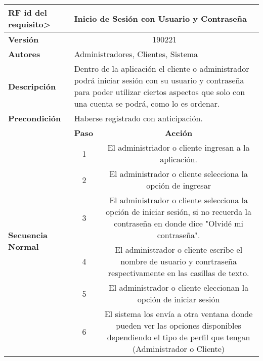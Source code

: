 \documentclass[conference]{IEEEtran}
\begin{document}
\begin{table}[H]
  \centering
   \begin{adjustbox}{width=0.45\textwidth}
    \begin{tabular}{|p{11.215em}|p{5.355em}|c|}
    \toprule
    \textbf{RF id del requisito>} & \multicolumn{2}{p{37.355em}|}{\textbf{Inicio de Sesión con Usuario y Contraseña}} \\
    \midrule
    \textbf{Versión} & \multicolumn{2}{c|}{190221} \\
    \midrule
    \textbf{Autores} & \multicolumn{2}{p{37.355em}|}{Administradores, Clientes, Sistema} \\
    \midrule
    \textbf{Descripción} & \multicolumn{2}{p{37.355em}|}{Dentro de la aplicación el cliente o administrador podrá iniciar sesión con su usuario y contraseña para poder utilizar ciertos aspectos que solo con una cuenta se podrá, como lo es ordenar.} \\
    \midrule
    \textbf{Precondición} & \multicolumn{2}{p{37.355em}|}{Haberse registrado con anticipación.} \\
    \midrule
    \multirow{9}[16]{*}{\textbf{Secuencia Normal}} & \textbf{Paso} & \multicolumn{1}{p{32em}|}{\textbf{Acción}} \\
\cmidrule{2-3}    \multicolumn{1}{|c|}{} & \multicolumn{1}{c|}{\multirow{2}[2]{*}{1}} & \multicolumn{1}{c|}{\multirow{2}[2]{*}{El administriador o cliente ingresan a la aplicación.}} \\
    \multicolumn{1}{|c|}{} & \multicolumn{1}{c|}{} &  \\
\cmidrule{2-3}    \multicolumn{1}{|c|}{} & \multicolumn{1}{c|}{2} & \multicolumn{1}{p{32em}|}{El administrador o cliente selecciona la opción de ingresar} \\
\cmidrule{2-3}    \multicolumn{1}{|c|}{} & \multicolumn{1}{c|}{3} & \multicolumn{1}{p{32em}|}{El administrador o cliente selecciona la opción de iniciar sesión, si no recuerda la contraseña en donde dice "Olvidé mi contraseña".} \\
\cmidrule{2-3}    \multicolumn{1}{|c|}{} & \multicolumn{1}{c|}{4} & \multicolumn{1}{p{32em}|}{El administrador o cliente escribe el nombre de usuario y conrtraseña respectivamente en las casillas de texto.} \\
\cmidrule{2-3}    \multicolumn{1}{|c|}{} & \multicolumn{1}{c|}{5} & \multicolumn{1}{p{32em}|}{El administrador o cliente eleccionan la opción de iniciar sesión} \\
\cmidrule{2-3}    \multicolumn{1}{|c|}{} & \multicolumn{1}{c|}{6} & \multicolumn{1}{p{32em}|}{El sistema los envía a otra ventana donde pueden ver las opciones disponibles dependiendo el tipo de perfil que tengan (Administrador o Cliente)} \\

\end{tabular}
\end{adjustbox}
\end{table}
\end{document}
